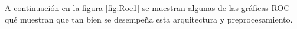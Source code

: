 \par A continuación en la figura \ref{fig:Roc1} se muestran algunas de las gráficas ROC qué muestran que tan bien se desempeña esta arquitectura y preprocesamiento.
\begin{figure}

	\begin{table}[H]
		\centering
\end{table}
\end{figure}
